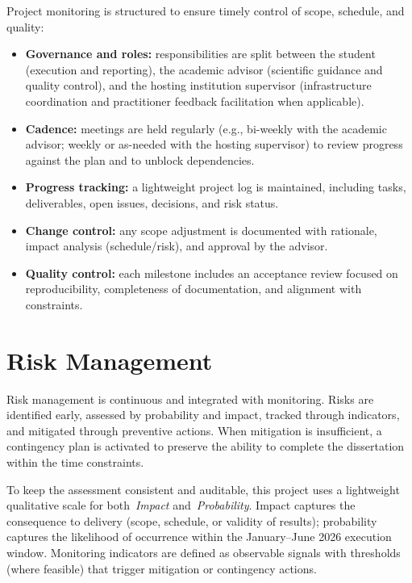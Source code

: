 Project monitoring is structured to ensure timely control of scope, schedule, and quality:
\begin{itemize}
    \item \textbf{Governance and roles:} responsibilities are split between the student (execution and reporting), the academic advisor (scientific guidance and quality control), and the hosting institution supervisor (infrastructure coordination and practitioner feedback facilitation when applicable).
    \item \textbf{Cadence:} meetings are held regularly (e.g., bi-weekly with the academic advisor; weekly or as-needed with the hosting supervisor) to review progress against the plan and to unblock dependencies.
    \item \textbf{Progress tracking:} a lightweight project log is maintained, including tasks, deliverables, open issues, decisions, and risk status.
    \item \textbf{Change control:} any scope adjustment is documented with rationale, impact analysis (schedule/risk), and approval by the advisor.
    \item \textbf{Quality control:} each milestone includes an acceptance review focused on reproducibility, completeness of documentation, and alignment with constraints.
\end{itemize}

\section{Risk Management}
\label{sec:ch3_risks}

Risk management is continuous and integrated with monitoring. Risks are identified early, assessed by probability and impact, tracked through indicators, and mitigated through preventive actions. When mitigation is insufficient, a contingency plan is activated to preserve the ability to complete the dissertation within the time constraints.

To keep the assessment consistent and auditable, this project uses a lightweight qualitative scale for both \,\textit{Impact} and \,\textit{Probability}. Impact captures the consequence to delivery (scope, schedule, or validity of results); probability captures the likelihood of occurrence within the January--June 2026 execution window. Monitoring indicators are defined as observable signals with thresholds (where feasible) that trigger mitigation or contingency actions.


